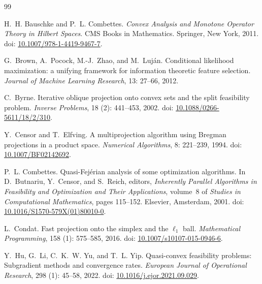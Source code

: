 \documentclass[]{interact}
\theoremstyle{plain}
\theoremstyle{definition}
\theoremstyle{remark}
\begin{document}
\begin{thebibliography}{99}
\newcommand{\bibdoi}[1]{doi: {\urlstyle{rm}\url{#1}}}

H.~H. Bauschke and P.~L. Combettes.
\newblock \emph{Convex Analysis and Monotone Operator Theory in {H}ilbert Spaces}.
\newblock CMS Books in Mathematics. Springer, New York, 2011.
\newblock \bibdoi{10.1007/978-1-4419-9467-7}.

G.~Brown, A.~Pocock, M.-J.~Zhao, and M.~Luj{\'a}n.
\newblock Conditional likelihood maximization: a unifying framework for information theoretic feature selection.
\newblock \emph{Journal of Machine Learning Research}, 13: 27--66, 2012.

C.~Byrne.
\newblock Iterative oblique projection onto convex sets and the split feasibility problem.
\newblock \emph{Inverse Problems}, 18 (2): 441--453, 2002.
\newblock \bibdoi{10.1088/0266-5611/18/2/310}.

Y.~Censor and T.~Elfving.
\newblock A multiprojection algorithm using {B}regman projections in a product space.
\newblock \emph{Numerical Algorithms}, 8: 221--239, 1994.
\newblock \bibdoi{10.1007/BF02142692}.

P.~L. Combettes.
\newblock Quasi-Fej{\'e}rian analysis of some optimization algorithms.
\newblock In D.~Butnariu, Y.~Censor, and S.~Reich, editors, \emph{Inherently Parallel Algorithms in Feasibility and Optimization and Their Applications}, volume~8 of \emph{Studies in Computational Mathematics}, pages 115--152. Elsevier, Amsterdam, 2001.
\newblock \bibdoi{10.1016/S1570-579X(01)80010-0}.

L.~Condat.
\newblock Fast projection onto the simplex and the $\ell_1$ ball.
\newblock \emph{Mathematical Programming}, 158 (1): 575--585, 2016.
\newblock \bibdoi{10.1007/s10107-015-0946-6}.

Y.~Hu, G.~Li, C.~K.~W. Yu, and T.~L. Yip.
\newblock Quasi-convex feasibility problems: Subgradient methods and convergence rates.
\newblock \emph{European Journal of Operational Research}, 298 (1): 45--58, 2022.
\newblock \bibdoi{10.1016/j.ejor.2021.09.029}.


\end{thebibliography}
\end{document}
